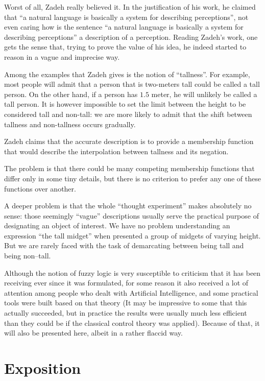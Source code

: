 Worst of all, Zadeh really believed it. In the justification
of his work, he claimed that ``a natural language is basically
a system for describing perceptions''\cite{Zadeh2008}, not
even caring how is the sentence ``a natural language is basically
a system for describing perceptions'' a description of
a perception. Reading Zadeh's work, one gets the sense that,
trying to prove the value of his idea, he indeed started to
reason in a vague and imprecise way.

Among the examples that Zadeh gives is the notion of ``tallness''.
For example, most people will admit that a person that is
two-meters tall could be called a tall person. On the other
hand, if a person has $1.5$ meter, he will unlikely be called
a tall person. It is however impossible to set the limit between
the height to be considered tall and non-tall: we are more
likely to admit that the shift between tallness and non-tallness
occurs gradually.

Zadeh claims that the accurate description is to provide
a membership function that would describe the interpolation
between tallness and its negation.

The problem is that there could be many competing
membership functions that differ only in some tiny details,
but there is no criterion to prefer any one of these functions
over another.

A deeper problem is that the whole ``thought experiment''
makes absolutely no sense: those seemingly ``vague''
descriptions usually serve the practical purpose
of designating an object of interest. We have no problem
understanding an expression ``the tall midget'' when
presented a group of midgets of varying height. But we
are rarely faced with the task of demarcating between
being tall and being non--tall.

Although the notion of fuzzy logic is very susceptible to
criticism that it has been receiving ever since it was
formulated, for some reason it also received a lot of attention
among people who dealt with Artificial Intelligence, and
some practical tools were built based on that theory
(It may be impressive to some that this actually succeeded,
but in practice the results were usually much less
efficient than they could be if the classical control
theory was applied).
Because of that, it will also be presented here, albeit
in a rather flaccid way.

\section{Exposition}

